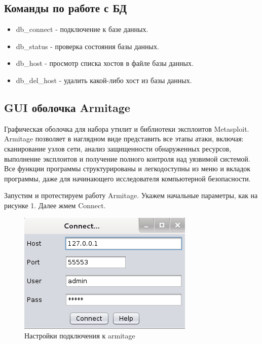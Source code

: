 \documentclass[11pt, a4paper]{article}		%
\begin{document}

\subsection{Команды по работе с БД}

\begin{itemize}

\item db\_connect - подключение к базе данных.

\item db\_status - проверка состояния базы данных.

\item db\_host - просмотр списка хостов в файле базы данных.

\item db\_del\_host - удалить какой-либо хост из базы данных.

\end{itemize}



\subsection{GUI оболочка Armitage}

Графическая оболочка для набора утилит и библиотеки эксплоитов Metasploit. Armitage позволяет в наглядном виде представить все этапы атаки, включая: сканирование узлов сети, анализ защищенности обнаруженных ресурсов, выполнение эксплоитов и получение полного контроля над уязвимой системой. Все функции программы структурированы и легкодоступны из меню и вкладок программы, даже для начинающего исследователя компьютерной безопасности.

Запустим и протестируем работу Armitage. Укажем начальные параметры, как на рисунке 1. Далее жмем Connect.

\begin{figure}[h!]
\centering
\includegraphics[scale=0.8]{res/armitage}
\caption{Настройки подключения к armitage}
\end{figure}
\end{document}
